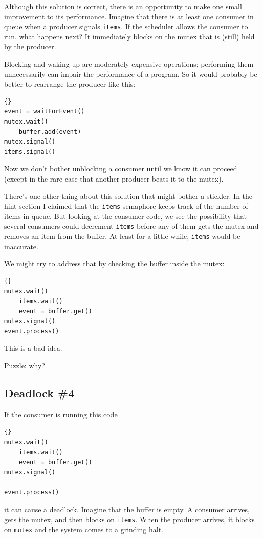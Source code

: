 \documentclass{book}
\begin{document}
Although this solution is correct, there is an opportunity
to make one small improvement to its performance.  Imagine
that there is at least one consumer in queue when a producer
signals {\tt items}.  If the scheduler allows the consumer
to run, what happens next?  It immediately blocks on the
mutex that is (still) held by the producer.

Blocking and waking up are moderately expensive operations;
performing them unnecessarily can impair the performance of
a program.  So it would probably be better to rearrange the
producer like this:

\begin{lstlisting}[title={Improved producer solution}]{}
event = waitForEvent()
mutex.wait()
    buffer.add(event)
mutex.signal()
items.signal()
\end{lstlisting}

Now we don't bother unblocking a consumer until we know it can proceed
(except in the rare case that another producer beats it to the mutex).

There's one other thing about this solution that might bother
a stickler.  In the hint section I claimed that the {\tt items}
semaphore keeps track of the number of items in queue.  But looking
at the consumer code, we see the possibility that several consumers
could decrement {\tt items} before any of them gets the mutex
and removes an item from the buffer.  At least for a little while,
{\tt items} would be inaccurate.

We might try to address that by checking the buffer inside the
mutex:

\begin{lstlisting}[title={Broken consumer solution}]{}
mutex.wait()
    items.wait()
    event = buffer.get()
mutex.signal()
event.process()
\end{lstlisting}

This is a bad idea.

Puzzle: why?



\subsection{Deadlock \#4}

If the consumer is running this code

\begin{lstlisting}[title={Broken consumer solution}]{}
mutex.wait()
    items.wait()
    event = buffer.get()
mutex.signal()

event.process()
\end{lstlisting}
%
it can cause a deadlock.  Imagine that the buffer is empty.
A consumer arrives, gets the mutex, and then blocks on
    {\tt items}.  When the producer arrives, it blocks on
    {\tt mutex} and the system comes to a grinding halt.
\end{document}
